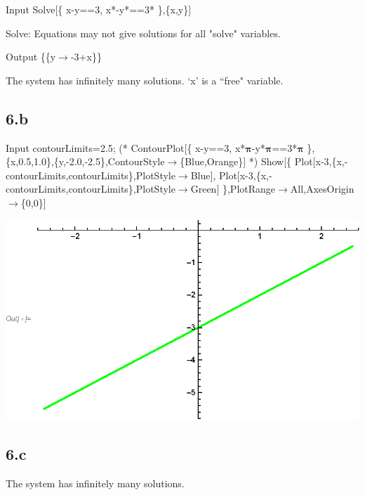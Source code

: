 \documentclass[11pt,a4paper]{article}
\begin{document}
\begin{mmaCell}[morefunctionlocal={x, y}]{Input}
Solve[\{
  x-y==3,
  x*\mmaDef{\(\pmb{\pi}\)}-y*\mmaDef{\(\pmb{\pi}\)}==3*\mmaDef{\(\pmb{\pi}\)}
\},\{x,y\}]
\end{mmaCell}

Solve: Equations may not give solutions for all "solve" variables.

\begin{mmaCell}{Output}
\{\{y\(\to\)-3+x\}\}
\end{mmaCell}

The system has infinitely many solutions. `x' is a ``free" variable. 

\subsection*{6.b}

\begin{mmaCell}[moredefined={contourLimits},morefunctionlocal={x}]{Input}
contourLimits=2.5;
(*
ContourPlot[\{
  x-y==3,
  x*\(\pmb{\pi}\)-y*\(\pmb{\pi}\)==3*\(\pmb{\pi}\)
\},\{x,0.5,1.0\},\{y,-2.0,-2.5\},ContourStyle\(\pmb{\to}\)\{Blue,Orange\}]
*)
Show[\{
  Plot[x-3,\{x,-contourLimits,contourLimits\},PlotStyle\(\pmb{\to}\)Blue],
  Plot[x-3,\{x,-contourLimits,contourLimits\},PlotStyle\(\pmb{\to}\)Green]
\},PlotRange\(\pmb{\to}\)All,AxesOrigin \(\pmb{\to}\)\{0,0\}]
\end{mmaCell}

\includegraphics{MathematicaP1_gr1.eps}

\subsection*{6.c}

The system has infinitely many solutions.
\end{document}

